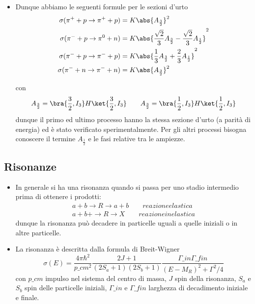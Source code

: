 \begin{itemize}
    \item Dunque abbiamo le seguenti formule per le sezioni d'urto 
    \begin{equation}\label{eq:sez_urto_pion_nucleon}
        \begin{aligned}
            \sigma(\pi^++p\to\pi^++p)&=K\abs{A_{\frac32}}^2\\
            \sigma(\pi^-+p\to\pi^0+n)&=K\abs{\frac{\sqrt2}3 A_{\frac32}-\frac{\sqrt2}3A_{\frac12}}^2\\
            \sigma(\pi^-+p\to\pi^-+p)&=K\abs{\frac13 A_{\frac32}+\frac23A_{\frac12}}^2\\
            \sigma(\pi^-+n\to\pi^-+n)&=K\abs{A_{\frac32}}^2
            \end{aligned}
    \end{equation}
    
    con 
    \begin{equation*}
    A_{\frac32}=\bra{\frac32,I_3}H\ket{\frac32,I_3}\qquad A_{\frac32}=\bra{\frac12,I_3}H\ket{\frac12,I_3}
    \end{equation*}
    dunque il primo ed ultimo processo hanno la stessa sezione d'urto (a parità di energia) ed è stato verificato sperimentalmente. Per gli altri processi bisogna conoscere il termine $A_{\frac12}$ e le fasi relative tra le ampiezze.
\end{itemize}
\subsection{Risonanze}
\begin{itemize}
\item In generale si ha una risonanza quando si passa per uno stadio intermedio prima di ottenere i prodotti:
\begin{gather*}
a+b\to R\to a+b\qquad{reazione elastica}\\
a+b+\to R\to X \qquad{reazione inelastica}
\end{gather*}
dunque la risonanza può decadere in particelle uguali a quelle iniziali o in altre particelle. 
\item La risonanza è descritta dalla formula di Breit-Wigner
\begin{equation*}
\sigma(E)=\frac{4\pi\hbar^2}{p\_{cm}^2}\frac{2J+1}{(2S_a+1)(2S_b+1)}\frac{\Gamma\_{in}\Gamma\_{fin}}{(E-M_R)^2+\Gamma^2/4}
\end{equation*}
con $p\_{cm}$ impulso nel sistema del centro di massa, $J$ spin della risonanza, $S_a$ e $S_b$ spin delle particelle iniziali, $\Gamma\_{in}$ e $\Gamma\_{fin}$ larghezza di decadimento iniziale e finale.
\end{itemize}

